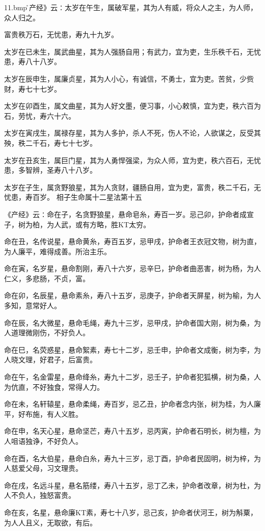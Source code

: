 \documentclass[a4paper,12pt,UTF8,twoside]{ctexbook}
\begin{document}
\pyxfc11.bmp\r《产经》云∶太岁在午生，属破军星，其为人有威，将众人之主，为人师，众人归之。

富贵秩万石，无忧患，寿九十九岁。

太岁在已未生，属武曲星，其为人强肠自用；有武力，宜为吏，生乐秩千石，无忧患，寿八十八岁。

太岁在辰申生，属廉贞星，其为人小心，有诚信，不勇士，宜为吏。苦贫，少赀财，寿七十七岁。

太岁在卯酉生，属文曲星，其为人好文墨，便习事，小心敕慎，宜为吏，秩六百为石，劳忧，寿六十六。

太岁在寅戌生，属禄存星，其为人多护，杀人不死，伤人不论，人欲谋之，反受其殃，秩二千石，寿七十七岁。

太岁在丑亥生，属巨门星，其为人勇悍强梁，为众人师，宜为吏，秩六百石，无忧患，多智辨，圣寿八十八岁。

太岁在子生，属贪野狼星，其为人贪财，疆肠自用，宜为吏，富贵，秩二千石，无忧患，寿百岁。
相子生命属十二星法第十五

《产经》云∶命在子，名贪野狼星，悬命皂糸，寿百一岁。忌己卯，护命者成宣子，树为柏，为人武，或有方略，胜KT太穷。

命在丑，名传说星，悬命黄糸，寿百五岁，忌甲戌，护命者王衣冠文物，树为直，为人廉平，难得成善。所治主乐。

命在寅，名岁星，悬命割刚，寿八十六岁，忌辛巳，护命者曲恶害，树为杨，为人仁义，多悲肠，不贞，富。

命在卯，名辰星，悬命素糸，寿八十五岁，忌庚子，护命者天屏星，树为榆，为人多知，意常好人。

命在辰，名大微星，悬命毛绳，寿九十三岁，忌甲戌，护命者国大刚，树为桑，为人道理微刚伤，不好负人。

命在巳，名荧惑星，悬命絮素，寿七十二岁，忌壬申，护命者文成衡，树为李，为人晓文理，好君子，后富贵。

命在午，名金雷星，悬命绛糸，寿九十二岁，忌壬子，护命者犯狐横，树为桑，人为伉直，不好独食，常得人力。

命在未，名轩辕星，悬命柔绳，寿百岁，忌乙丑，护命者念内张，树为桂，为人廉平，好布施，有人义胜。

命在申，名天心星，悬命坚芒，寿八十五岁，忌丙寅，护命者石明长，树为檀，为人咀语独诤，不好负人。

命在酉，名大伯星，悬命白糸，寿九十三岁，忌丁酉，护命者民固明，树为梓，为人慈爱父母，习文理贵。

命在戌，名远斗星，悬名筋缕，寿八十五岁，忌丁乙未，护命者改章，树为杜，为人不负人，独怒富贵。

命在亥，名星，悬命廉KT素，寿七十八岁，忌己亥，护命者伏河王，树为斛粟，为人人且义，无取欲，有后。
\end{document}
